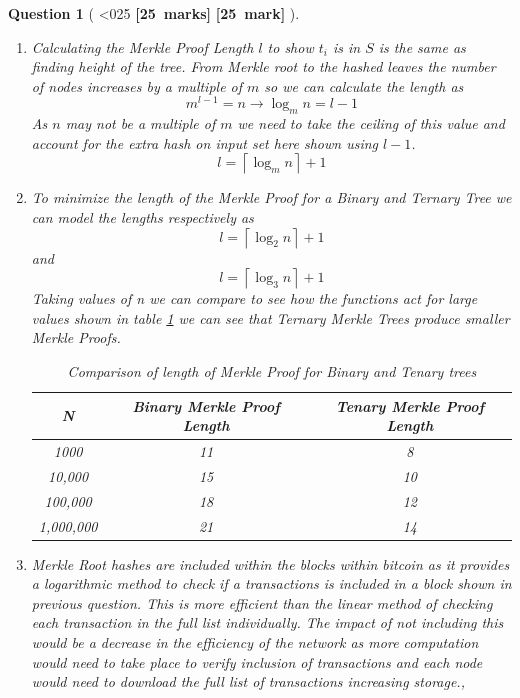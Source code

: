 \documentclass[a4paper]{article}
\theoremstyle{que}
\newtheorem{question}{Question}
\newcommand\points[1]{%
\ifnum1<0#1\relax%
    {\bf \small [#1~marks]}%
  \else%
    {\bf \small [#1~mark]}%
  \fi%
}%
\begin{document}
\begin{question}[\points{25}]
\begin{enumerate}[label=(\alph*)]
\begin{figure}[h!]
\end{figure}
    \item[(ii)] Calculating the Merkle Proof Length \(l\) to show \(t_i\) is in \(S\) is the same as finding height of the tree. From Merkle root to the hashed leaves the number of nodes increases by a multiple of \(m\) so we can calculate the length as \[m^{l-1} = n \rightarrow \log_m n = l - 1\] As \(n\) may not be a multiple of \(m\) we need to take the ceiling of this value and account for the extra hash on input set here shown using \(l-1\). \[ l = \left\lceil \log_m n \right\rceil + 1\]
    \item[(iii)] To minimize the length of the Merkle Proof for a Binary and Ternary Tree we can model the lengths respectively as \[ l = \left\lceil \log_2 n \right\rceil + 1\] and \[ l = \left\lceil \log_3 n \right\rceil + 1\]
    Taking values of n we can compare to see how the functions act for large values shown in table \ref{table:two_column_blank} we can see that Ternary Merkle Trees produce smaller Merkle Proofs.
    \begin{table}[h!]
    \centering
    \begin{tabular}{|c|c|c|}
    \hline
    \textbf{N} & \textbf{Binary Merkle Proof Length} & \textbf{Tenary Merkle Proof Length} \\ 
    \hline
             1000 &  11 &   8   \\ 
    \hline
                  10,000  &  15 &    10            \\ 
    \hline
                100,000     & 18  &      12          \\ 
    \hline
               1,000,000      &  21  &       14        \\ 
    \hline
    \end{tabular}
    \caption{Comparison of length of Merkle Proof for Binary and Tenary trees}
    \label{table:two_column_blank}
    \end{table}
    
    \item Merkle Root hashes are included within the blocks within bitcoin as it provides a logarithmic method to check if a transactions is included in a block shown in previous question. This is more efficient than the linear method of checking each transaction in the full list individually. The impact of not including this would be a decrease in the efficiency of the network as more computation would need to take place to verify inclusion of transactions and each node would need to download the full list of transactions increasing storage., 
    

\end{enumerate}
\end{question}
\end{document}
